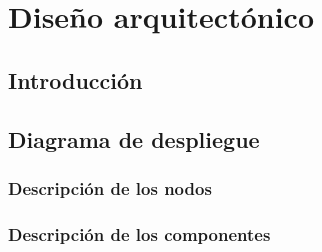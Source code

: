 \chapter{Diseño arquitectónico} \label{cap:arquitectura}

\section{Introducción}

\section{Diagrama de despliegue}

\subsection{Descripción de los nodos}

\subsection{Descripción de los componentes}